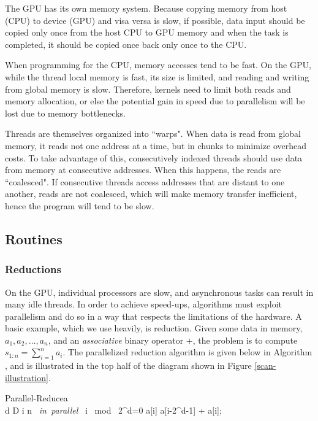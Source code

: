 The GPU has its own memory system. Because copying memory from host (CPU) to device (GPU) and visa versa is slow, if possible, data input should be copied only once from the host CPU to GPU memory and when the task is completed, it should be copied once back only once to the CPU.

When programming for the CPU, memory accesses tend to be fast. On the GPU, while the thread local memory is fast, its size is limited, and reading and writing from global memory is slow. Therefore, kernels need to limit both reads and memory allocation, or else the potential gain in speed due to parallelism will be lost due to memory bottlenecks.

Threads are themselves organized into ``warps". When data is read from global memory, it reads not one address at a time, but in chunks to minimize overhead costs. To take advantage of this, consecutively indexed threads should use data from memory at consecutive addresses. When this happens, the reads are ``coalesced". If consecutive threads access addresses that are distant to one another, reads are not coalesced, which will make memory transfer inefficient, hence the program will tend to be slow.

\subsection{Routines}
\label{sec:routines}
\subsubsection{Reductions}
\label{subsec:reduce}
On the GPU, individual processors are slow, and asynchronous tasks can result in many idle threads. In order to achieve speed-ups, algorithms must exploit parallelism and do so in a way that respects the limitations of the hardware. A basic example, which we use heavily, is reduction. Given some data in memory, $a_1, a_2, \ldots, a_n$, and an \textit{associative} binary operator $+$, the problem is to compute $s_{1:n}=\sum_{i=1}^n a_i$. The parallelized reduction algorithm is given below in Algorithm \label{reduce}, and is illustrated in the top half of the diagram shown in Figure \ref{scan-illustration}.  

\begin{pseudocode}[ruled]{Parallel-Reduce}{a}
\label{reduce}
\\
\FOR d  \TO D \DO \BEGIN
  \FOR i  \TO n \mbox{ \em in parallel }\DO \BEGIN
    \IF i \mbox{ mod } 2^d=0 \DO \BEGIN
    a[i] \GETS a[i-2^{d-1}] + a[i];\\
    \END \END \END
\end{pseudocode}

